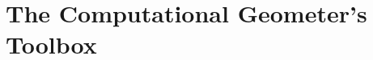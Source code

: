 \renewcommand{\parthook}{%
\AddToShipoutPictureBG*{%
\AtPageLowerLeft{\texttt{[image: figures/geometry]}}}%
\renewcommand{\parthook}{}}%
\part{The Computational Geometer's Toolbox}\label{sec:preliminaries}




\clearemptydoublepage


\clearemptydoublepage


\clearemptydoublepage




